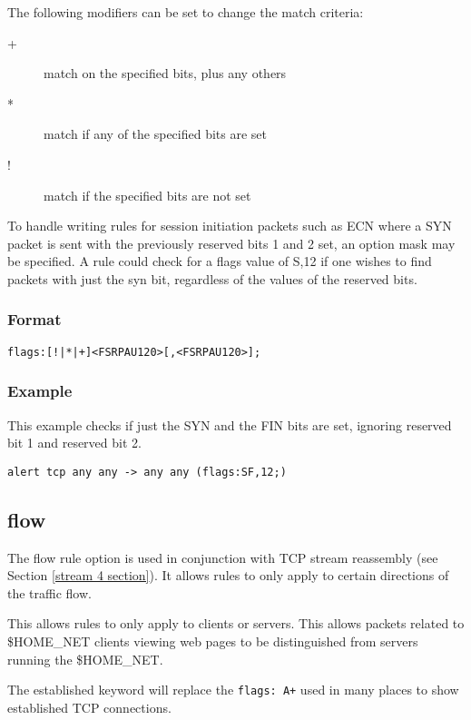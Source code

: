 \documentclass[english]{report}
\begin{document}
The following modifiers can be set to change the match criteria:
\begin{description}
\item [+] match on the specified bits, plus any others
\item [*] match if any of the specified bits are set
\item [!] match if the specified bits are not set
\end{description}

To handle writing rules for session initiation packets such as ECN where a SYN
packet is sent with the previously reserved bits 1 and 2 set, an option mask
may be specified. A rule could check for a flags value of S,12 if one wishes to
find packets with just the syn bit, regardless of the values of the reserved
bits.

\subsubsection{Format}

\begin{verbatim}
flags:[!|*|+]<FSRPAU120>[,<FSRPAU120>];
\end{verbatim}

\subsubsection{Example}

This example checks if just the SYN and the FIN bits are set, ignoring reserved
bit 1 and reserved bit 2.
\begin{verbatim}
alert tcp any any -> any any (flags:SF,12;)
\end{verbatim}

\subsection{flow\label{flow section}}

The flow rule option is used in conjunction with TCP stream reassembly
(see Section \ref{stream 4 section}). It allows rules to only apply
to certain directions of the traffic flow. 

This allows rules to only apply to clients or servers. This allows
packets related to \$HOME\_NET clients viewing web pages to be distinguished
from servers running the \$HOME\_NET.

The established keyword will replace the \texttt{flags: A+} used in
many places to show established TCP connections.
\end{document}
